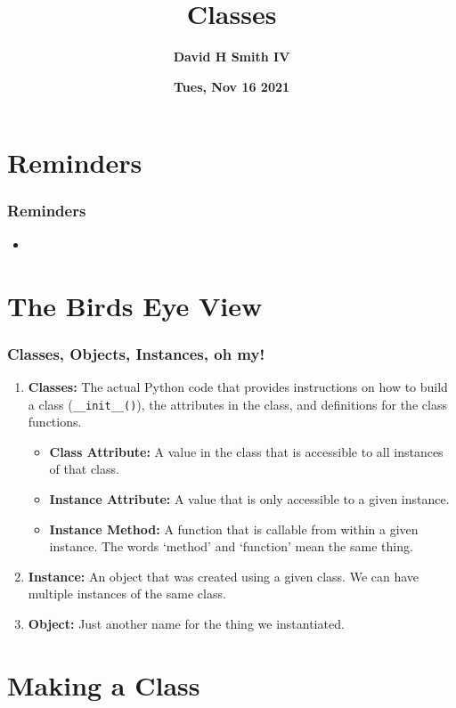 \documentclass{beamer}
\title{\textbf{Classes}}
\author{\textbf{David H Smith IV}}
\institute[\textbf{UIUC}]{\textbf{University of Illinois Urbana-Champaign}}
\date{\textbf{Tues, Nov 16 2021}}
\begin{document}
\frame{\titlepage}

\section{Reminders}

%
%
\begin{frame}
    \frametitle{Reminders}
    \begin{itemize}
        \item 
    \end{itemize}
\end{frame}

\section{The Birds Eye View}

%
%
\begin{frame}[fragile]
    \frametitle{Classes, Objects, Instances, oh my!}
    \begin{enumerate}[A]
        \item \textbf{Classes:} The actual Python code that provides instructions on how to build a class (\lstinline|__init__()|), the attributes in the class, and definitions for the class functions.
            \pause
            \begin{itemize}
                \item \textbf{Class Attribute: } A value in the class that is accessible to all instances of that class.
                    \pause
                \item \textbf{Instance Attribute: } A value that is only accessible to a given instance.
                    \pause
                \item \textbf{Instance Method: } A function that is callable from within a given instance. The words `method' and `function' mean the same thing.
            \end{itemize}
            \pause
        \item \textbf{Instance:} An object that was created using a given class. We can have multiple instances of the same class.
            \pause
        \item \textbf{Object:} Just another name for the thing we instantiated.
    \end{enumerate}
\end{frame}

\section{Making a Class}
\end{document}
